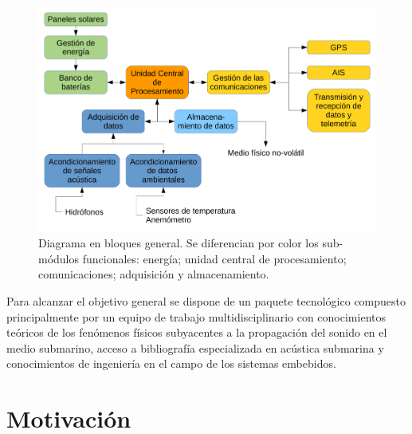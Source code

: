 \begin{figure}[ht]
  \centering
	\includegraphics[width=\textwidth]{./Figures/Diagrama_en_Bloques.pdf}
	\caption[Diagrama en bloques general del sistema.]{Diagrama en bloques general. Se diferencian por color los sub-módulos funcionales: energía; unidad central de procesamiento; comunicaciones; adquisición y almacenamiento.}
	\label{fig:diagramaBloques}
\end{figure}

Para alcanzar el objetivo general se dispone de un paquete tecnológico compuesto principalmente por un equipo de trabajo multidisciplinario con conocimientos teóricos de los fenómenos físicos subyacentes a la propagación del sonido en el medio submarino, acceso a bibliografía especializada en acústica submarina y  conocimientos de ingeniería en el campo de los sistemas embebidos.





\section{Motivación}

